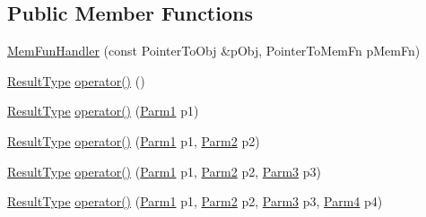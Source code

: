 \subsection*{Public Member Functions}
\begin{DoxyCompactItemize}
\item 
\mbox{\hyperlink{classUtil_1_1MemFunHandler_af946fcda2a7e2d785062d6bb5f544b76}{Mem\+Fun\+Handler}} (const Pointer\+To\+Obj \&p\+Obj, Pointer\+To\+Mem\+Fn p\+Mem\+Fn)
\item 
\mbox{\hyperlink{classUtil_1_1MemFunHandler_a093690dcced95ad48c5429e50006c83e}{Result\+Type}} \mbox{\hyperlink{classUtil_1_1MemFunHandler_a8dcf5e697b0534283d4a60741d0ca80d}{operator()}} ()
\item 
\mbox{\hyperlink{classUtil_1_1MemFunHandler_a093690dcced95ad48c5429e50006c83e}{Result\+Type}} \mbox{\hyperlink{classUtil_1_1MemFunHandler_a5d20125065c3cc89ca77c0c546923523}{operator()}} (\mbox{\hyperlink{classUtil_1_1MemFunHandler_a43182733677fc623d89e5613ecf15761}{Parm1}} p1)
\item 
\mbox{\hyperlink{classUtil_1_1MemFunHandler_a093690dcced95ad48c5429e50006c83e}{Result\+Type}} \mbox{\hyperlink{classUtil_1_1MemFunHandler_a193366447f7adcd2efceddfdefce2f9a}{operator()}} (\mbox{\hyperlink{classUtil_1_1MemFunHandler_a43182733677fc623d89e5613ecf15761}{Parm1}} p1, \mbox{\hyperlink{classUtil_1_1MemFunHandler_a9d454c62047cb4bff3173b5bda9a38c8}{Parm2}} p2)
\item 
\mbox{\hyperlink{classUtil_1_1MemFunHandler_a093690dcced95ad48c5429e50006c83e}{Result\+Type}} \mbox{\hyperlink{classUtil_1_1MemFunHandler_ae5a7b0421e77aa263c762df15c043ea4}{operator()}} (\mbox{\hyperlink{classUtil_1_1MemFunHandler_a43182733677fc623d89e5613ecf15761}{Parm1}} p1, \mbox{\hyperlink{classUtil_1_1MemFunHandler_a9d454c62047cb4bff3173b5bda9a38c8}{Parm2}} p2, \mbox{\hyperlink{classUtil_1_1MemFunHandler_a6cbef94d16f4d6b29d6a8a90afbeff4f}{Parm3}} p3)
\item 
\mbox{\hyperlink{classUtil_1_1MemFunHandler_a093690dcced95ad48c5429e50006c83e}{Result\+Type}} \mbox{\hyperlink{classUtil_1_1MemFunHandler_a3b8e6d9b4cb79aa0c8c4875422b10eba}{operator()}} (\mbox{\hyperlink{classUtil_1_1MemFunHandler_a43182733677fc623d89e5613ecf15761}{Parm1}} p1, \mbox{\hyperlink{classUtil_1_1MemFunHandler_a9d454c62047cb4bff3173b5bda9a38c8}{Parm2}} p2, \mbox{\hyperlink{classUtil_1_1MemFunHandler_a6cbef94d16f4d6b29d6a8a90afbeff4f}{Parm3}} p3, \mbox{\hyperlink{classUtil_1_1MemFunHandler_a1e5a0cf582f3b540e409d333ae06a4bd}{Parm4}} p4)
\item 

\end{DoxyCompactItemize}
